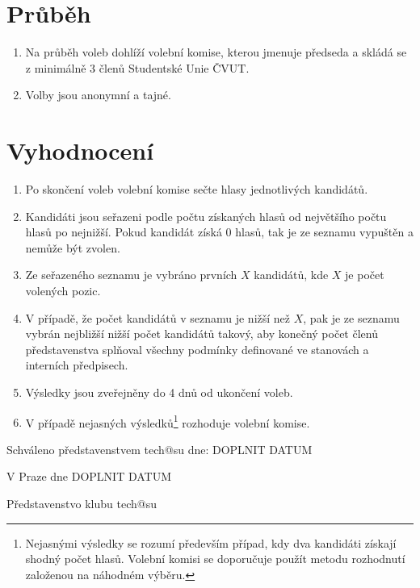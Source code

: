 \documentclass[10pt]{article}
\def \Datum {DOPLNIT DATUM} %
\begin{document}
\section{Průběh}
	\begin{enumerate}
		\item Na průběh voleb dohlíží volební komise, kterou jmenuje předseda a skládá se z minimálně 3 členů Studentské Unie ČVUT.
		\item Volby jsou anonymní a tajné.
	\end{enumerate}

\section{Vyhodnocení}
	\begin{enumerate}
		\item Po skončení voleb volební komise sečte hlasy jednotlivých kandidátů.
		\item Kandidáti jsou seřazeni podle počtu získaných hlasů od největšího počtu hlasů po nejnižší. Pokud kandidát získá 0 hlasů, tak je ze seznamu vypuštěn a nemůže být zvolen.
		\item Ze seřazeného seznamu je vybráno prvních $X$ kandidátů, kde $X$ je počet volených pozic.
		\item V případě, že počet kandidátů v seznamu je nižší než $X$, pak je ze seznamu vybrán nejbližší nižší počet kandidátů takový, aby konečný počet členů představenstva splňoval všechny podmínky definované ve stanovách a interních předpisech.
		\item Výsledky jsou zveřejněny do 4 dnů od ukončení voleb.
		\item V případě nejasných výsledků\footnote{Nejasnými výsledky se rozumí především případ, kdy dva kandidáti získají shodný počet hlasů. Volební komisi se doporučuje použít metodu rozhodnutí založenou na náhodném výběru.} rozhoduje volební komise.
	\end{enumerate}

\vspace{10mm}

Schváleno představenstvem tech@su dne: \Datum

\vspace{30mm}

\hfill V Praze dne \Datum

\hfill Představenstvo klubu tech@su
\end{document}
